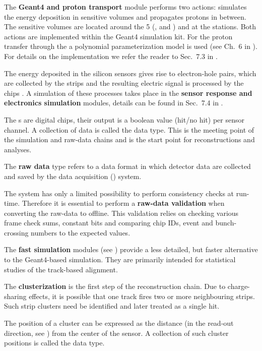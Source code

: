\> The {\bf Geant4 and proton transport} module performs two actions: simulates the energy deposition in sensitive volumes and propagates protons in between. The sensitive volumes are located around the 5 (,  and ) and at the  stations. Both actions are implemented within the Geant4  simulation kit. For the proton transfer through the  a polynomial parameterization model is used (see Ch.~6 in ). For details on the implementation we refer the reader to Sec.~7.3 in .

\> The energy deposited in the silicon sensors gives rise to electron-hole pairs, which are collected by the strips and the resulting electric signal is processed by the  chips . A simulation of these processes takes place in the {\bf sensor response and electronics simulation} modules, details can be found in Sec.~7.4 in .

\> The s are digital chips, their output is a boolean value (hit/no hit) per sensor channel. A collection of  data is called the {\bf {}} data type. This is the meeting point of the simulation and raw-data chains and is the start point for reconstructions and analyses.

\> The {\bf raw data} type refers to a data format in which detector data are collected and saved by the data acquisition () system.

\> The  system has only a limited possibility to perform consistency checks at run-time. Therefore it is essential to perform a {\bf raw-data validation} when converting the raw-data to  offline. This validation relies on checking various frame check sums, constant bits and comparing chip IDs, event and bunch-crossing numbers to the expected values.

\> The {\bf fast simulation} modules (see ) provide a less detailed, but faster alternative to the Geant4-based simulation. They are primarily intended for statistical studies of the track-based alignment.

\> The {\bf clusterization} is the first step of the reconstruction chain. Due to charge-sharing effects, it is possible that one track fires two or more neighbouring strips. Such strip clusters need be identified and later treated as a single hit.

\> The position of a cluster can be expressed as the distance (in the read-out direction, see ) from the center of the sensor. A collection of such cluster positions is called the {\bf {}} data type.

